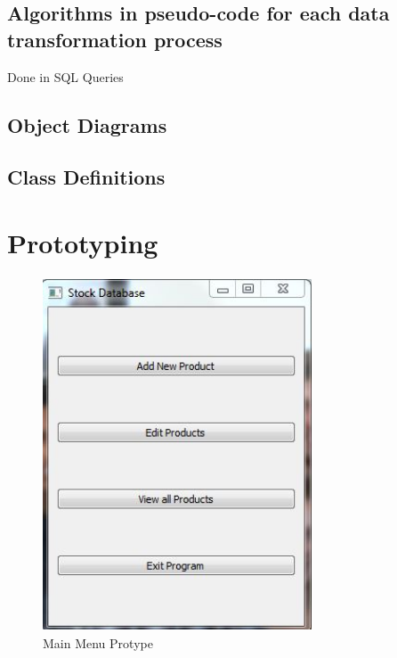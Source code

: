 \subsection{Algorithms in pseudo-code for each data transformation process}
Done in SQL Queries 
\subsection{Object Diagrams}

\subsection{Class Definitions}

\section{Prototyping}

\begin{figure}[H]
	\centering
	\includegraphics[width= 8cm, height = 10.5cm]{Design/images/menu_prototype.JPG}
	\caption {Main Menu Protype} \label{fig:main_menu_prototype}
\end{figure}


